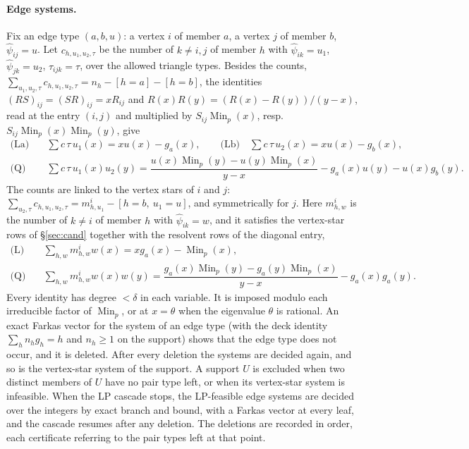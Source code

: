 \documentclass[11pt]{article}
\theoremstyle{definition}
\newcommand{\Min}{\operatorname{Min}}
\begin{document}
\paragraph{Edge systems.} Fix an edge type $(a,b,u)$: a vertex $i$ of member $a$, a vertex $j$ of
member $b$, $\widehat\psi_{ij}=u$. Let $c_{h,u_1,u_2,\tau}$ be the number of $k\ne i,j$ of member $h$
with $\widehat\psi_{ik}=u_1$, $\widehat\psi_{jk}=u_2$, $\tau_{ijk}=\tau$, over the allowed triangle types.
Besides the counts, $\sum_{u_1,u_2,\tau}c_{h,u_1,u_2,\tau}=n_h-[h=a]-[h=b]$, the identities
$(RS)_{ij}=(SR)_{ij}=xR_{ij}$ and $R(x)R(y)=(R(x)-R(y))/(y-x)$, read at the entry $(i,j)$ and
multiplied by $S_{ij}\Min_p(x)$, resp.\ $S_{ij}\Min_p(x)\Min_p(y)$, give
\begin{align*}
\text{(La)}\quad&\textstyle\sum c\,\tau\,u_1(x)=xu(x)-g_a(x),\qquad
\text{(Lb)}\quad\sum c\,\tau\,u_2(x)=xu(x)-g_b(x),\\
\text{(Q)}\quad&\textstyle\sum c\,\tau\,u_1(x)u_2(y)=\dfrac{u(x)\Min_p(y)-u(y)\Min_p(x)}{y-x}-g_a(x)u(y)-u(x)g_b(y).
\end{align*}
The counts are linked to the vertex stars of $i$ and $j$: $\sum_{u_2,\tau}c_{h,u_1,u_2,\tau}=m^i_{h,u_1}-[h=b,\ u_1=u]$,
and symmetrically for $j$. Here $m^i_{h,w}$ is the number of $k\ne i$ of member $h$ with
$\widehat\psi_{ik}=w$, and it satisfies the vertex-star rows of \S\ref{sec:cand} together with the
resolvent rows of the diagonal entry,
\begin{align*}
\text{(L)}\quad&\textstyle\sum_{h,w}m^i_{h,w}w(x)=xg_a(x)-\Min_p(x),\\
\text{(Q)}\quad&\textstyle\sum_{h,w}m^i_{h,w}w(x)w(y)=\dfrac{g_a(x)\Min_p(y)-g_a(y)\Min_p(x)}{y-x}-g_a(x)g_a(y).
\end{align*}
Every identity has degree $<\delta$ in each variable. It is imposed modulo each irreducible factor of
$\Min_p$, or at $x=\theta$ when the eigenvalue $\theta$ is rational. An exact Farkas vector for the
system of an edge type (with the deck identity $\sum_hn_hg_h=h$ and $n_h\ge1$ on the support) shows
that the edge type does not occur, and it is deleted. After every deletion the systems are decided
again, and so is the vertex-star system of the support. A support $U$ is excluded when two distinct
members of $U$ have no pair type left, or when its vertex-star system is infeasible. When the LP cascade
stops, the LP-feasible edge systems are decided over the integers by exact branch and bound, with a
Farkas vector at every leaf, and the cascade resumes after any deletion. The deletions are recorded
in order, each certificate referring to the pair types left at that point.
\end{document}
